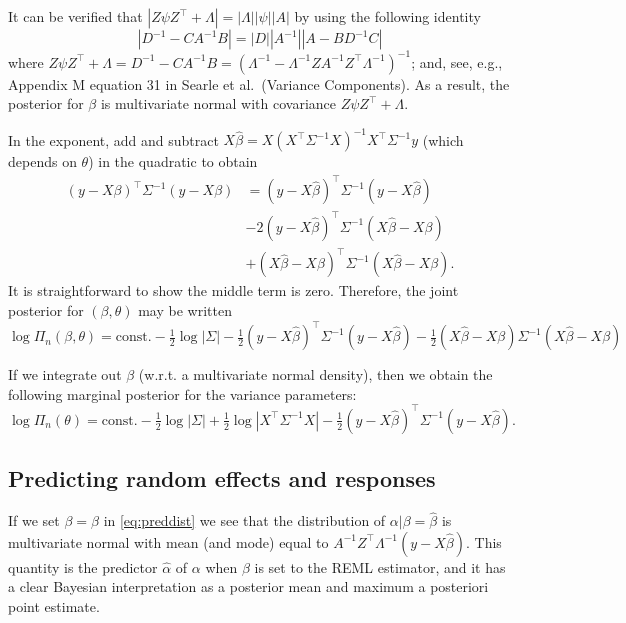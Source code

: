 \documentclass[
]{book}
\begin{document}
It can be verified that \(|Z\psi Z^\top +\Lambda| = |\Lambda||\psi||A|\) by using the following identity
\[|D^{-1} - CA^{-1}B| = |D||A^{-1}||A - BD^{-1}C|\]
where \(Z\psi Z^\top +\Lambda = D^{-1} - CA^{-1}B = (\Lambda^{-1} - \Lambda^{-1}ZA^{-1}Z^\top \Lambda^{-1})^{-1}\); and, see, e.g., Appendix M equation 31 in Searle et al.~(Variance Components). As a result, the posterior for \(\beta\) is multivariate normal with covariance \(Z\psi Z^\top +\Lambda\).

In the exponent, add and subtract \(X\hat\beta = X(X^\top \Sigma^{-1} X)^{-1}X^\top \Sigma^{-1}y\) (which depends on \(\theta\)) in the quadratic to obtain
\begin{align*}
\left(y - X\beta\right)^\top \Sigma^{-1}(y - X\beta) & = \left(y - X\hat\beta\right)^\top \Sigma^{-1}(y - X\hat\beta)\\
& -2 \left(y - X\hat\beta\right)^\top \Sigma^{-1}(X\hat\beta - X\beta)\\
& + \left(X\hat\beta - X\beta\right)^\top \Sigma^{-1}(X\hat\beta - X\beta).
\end{align*}
It is straightforward to show the middle term is zero. Therefore, the joint posterior for \((\beta, \theta)\) may be written
\[\log \Pi_n(\beta, \theta) = \text{const}. -\tfrac12\log|\Sigma|-\tfrac12(y-X\hat\beta)^\top \Sigma^{-1}(y-X\hat\beta) -\tfrac12(X\hat\beta - X\beta)\Sigma^{-1}(X\hat\beta - X\beta)\]

If we integrate out \(\beta\) (w.r.t. a multivariate normal density), then we obtain the following marginal posterior for the variance parameters:
\[\log\Pi_n(\theta) = \text{const.} - \tfrac{1}{2}\log|\Sigma| + \tfrac{1}{2}\log|X^\top \Sigma^{-1}X|-\tfrac12 \left(y - X\hat\beta\right)^\top \Sigma^{-1}(y - X\hat\beta).\]

\hypertarget{predicting-random-effects-and-responses}{%
\subsection{Predicting random effects and responses}\label{predicting-random-effects-and-responses}}

If we set \(\beta = \hat\beta\) in \eqref{eq:preddist} we see that the distribution of \(\alpha|\beta = \hat\beta\) is multivariate normal with mean (and mode) equal to \(A^{-1}Z^\top\Lambda^{-1}(y-X\hat\beta)\). This quantity is the predictor \(\hat\alpha\) of \(\alpha\) when \(\beta\) is set to the REML estimator, and it has a clear Bayesian interpretation as a posterior mean and maximum a posteriori point estimate.
\end{document}
